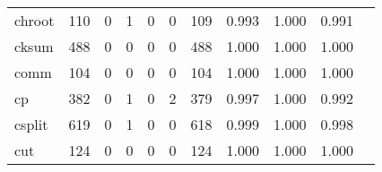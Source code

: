 \begin{longtable}{lp{1.2cm}p{1.2cm}p{1.2cm}p{1.2cm}p{1.2cm}p{1.2cm}p{1.2cm}p{1.2cm}p{1.2cm}p{1.2cm}}
chroot    &                                   110 &                                                  0 &                                                  1 &                                                  0 &                                                  0 &                                                109 &                                              0.993 &                                              1.000 &                                              0.991 \\
cksum     &                                   488 &                                                  0 &                                                  0 &                                                  0 &                                                  0 &                                                488 &                                              1.000 &                                              1.000 &                                              1.000 \\
comm      &                                   104 &                                                  0 &                                                  0 &                                                  0 &                                                  0 &                                                104 &                                              1.000 &                                              1.000 &                                              1.000 \\
cp        &                                   382 &                                                  0 &                                                  1 &                                                  0 &                                                  2 &                                                379 &                                              0.997 &                                              1.000 &                                              0.992 \\
csplit    &                                   619 &                                                  0 &                                                  1 &                                                  0 &                                                  0 &                                                618 &                                              0.999 &                                              1.000 &                                              0.998 \\
cut       &                                   124 &                                                  0 &                                                  0 &                                                  0 &                                                  0 &                                                124 &                                              1.000 &                                              1.000 &                                              1.000 \\

\end{longtable}
